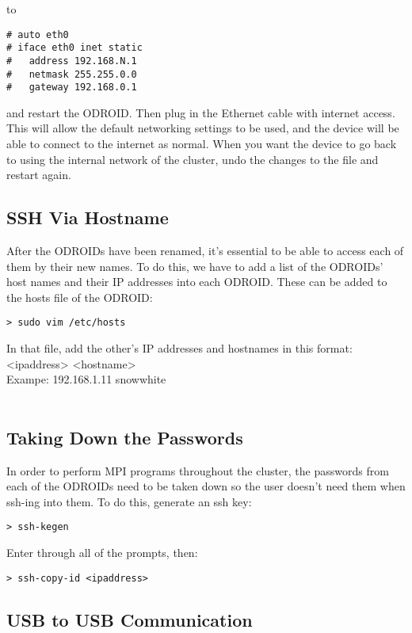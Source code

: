 to 

\begin{lstlisting}
# auto eth0
# iface eth0 inet static
#	address 192.168.N.1
#	netmask 255.255.0.0
#	gateway 192.168.0.1
\end{lstlisting}

and restart the ODROID. Then plug in the Ethernet cable with internet access. This will allow the default networking settings to be used, and the device will be able to connect to the internet as normal. When you want the device to go back to using the internal network of the cluster, undo the changes to the file and restart again.

\subsection{SSH Via Hostname}
After the ODROIDs have been renamed, it's essential to be able to access each of them by their new names. To do this, we have to add a list of the ODROIDs' host names and their IP addresses into each ODROID. These can be added to the hosts file of the ODROID:
\begin{lstlisting}
> sudo vim /etc/hosts
\end{lstlisting}
In that file, add the other's IP addresses and hostnames in this format: \\
<ipaddress> <hostname> \\
Exampe: 192.168.1.11 snow\textunderscore white \\ \\
 
\subsection{Taking Down the Passwords}
In order to perform MPI programs throughout the cluster, the passwords from each of the ODROIDs need to be taken down so the user doesn't need them when ssh-ing into them. To do this, generate an ssh key:
\begin{lstlisting}
> ssh-kegen
\end{lstlisting}
Enter through all of the prompts, then:
\begin{lstlisting}
> ssh-copy-id <ipaddress>
\end{lstlisting}

\subsection{USB to USB Communication}

